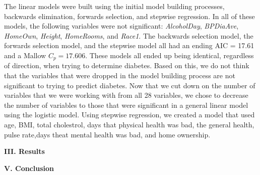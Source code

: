 \documentclass[letter,12pt]{article}
\begin{document}
	The linear models were built using the initial model building processes, backwards elimination, forwards selection, and stepwise regression. In all of these models, the following variables were not significant: \textit{AlcoholDay}, \textit{BPDiaAve}, \textit{HomeOwn}, \textit{Height}, \textit{HomeRooms}, and \textit{Race1}. The backwards selection model, the forwards selection model, and the stepwise model all had an ending AIC = 17.61 and a Mallow $C_{p} = 17.606$. These models all ended up being identical, regardless of direction, when trying to determine diabetes. Based on this, we do not think that the variables that were dropped in the model building process are not significant to trying to predict diabetes.
	Now that we cut down on the number of variables that we were working with from all 28 variables, we chose to decrease the number of variables to those that were significant in a general linear model using the logistic model. Using stepwise regression, we created a model that used age, BMI, total cholestrol, days that physical health was bad, the general health, pulse rate,days theat mental health was bad, and home ownership.
	

	\begin{center}
		\textbf{III. Results}\par
	\end{center}
	\justify
	
	\begin{center}
		\textbf{V. Conclusion}\par
	\end{center}
	\justify
	
	\newpage
	
\end{document}
